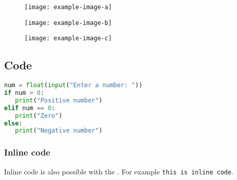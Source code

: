\begin{figure}[H]
	\centering
	\begin{minipage}{0.3\textwidth}
		\centering
		\texttt{[image: example-image-a]}
		\label{fig: style 2 image a}
	\end{minipage}
	\hfill
	\begin{minipage}{0.3\textwidth}
		\centering
		\texttt{[image: example-image-b]}
		\label{fig: style 2 image b}
	\end{minipage}
	\hfill
	\begin{minipage}{0.3\textwidth}
		\centering
		\texttt{[image: example-image-c]}
		\label{fig: style 2 image c}
	\end{minipage}
\end{figure}
\newpage

\subsection{Code}

\begin{lstlisting}[language=python]
num = float(input("Enter a number: "))
if num > 0:
   print("Positive number")
elif num == 0:
   print("Zero")
else:
   print("Negative number")
\end{lstlisting}

\subsubsection{Inline code} %

Inline code is also possible with the . For example \texttt{this is inline code}. %

